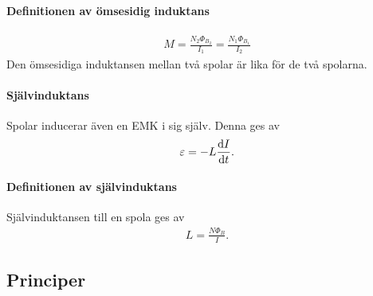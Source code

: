 \deriv

\paragraph{Definitionen av ömsesidig induktans}
\begin{align*}
	M = \frac{N_2\Phi_{B_2}}{I_1} = \frac{N_1\Phi_{B_1}}{I_2}
\end{align*}
Den ömsesidiga induktansen mellan två spolar är lika för de två spolarna.

\paragraph{Självinduktans}
Spolar inducerar även en EMK i sig själv. Denna ges av
\begin{align*}
	\varepsilon = -L\dv{I}{t}.
\end{align*}

\deriv

\paragraph{Definitionen av självinduktans}
Självinduktansen till en spola ges av
\begin{align*}
	L = \frac{N\Phi_{B}}{I}.
\end{align*}

\deriv

\subsection{Principer}

